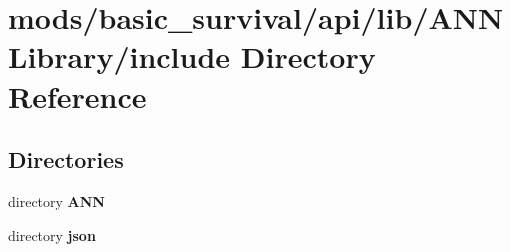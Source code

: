 \section{mods/basic\+\_\+survival/api/lib/\+A\+N\+N\+Library/include Directory Reference}
\label{dir_0c336f0e196caf2949470247b3fc9161}
\subsection*{Directories}
\begin{DoxyCompactItemize}
\item 
directory {\bf A\+N\+N}
\item 
directory {\bf json}
\end{DoxyCompactItemize}
